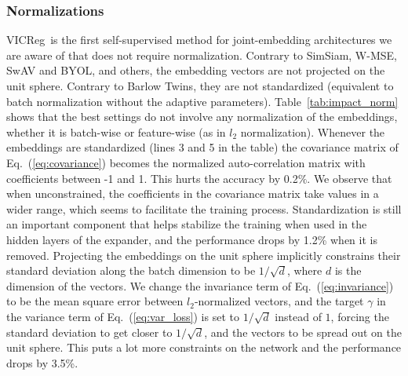 \documentclass{article}
\newcommand{\algo}{VICReg}
\newcommand{\expandernospace}{expander}
\begin{document}
\subsubsection{Normalizations} 
\algo \ is the first self-supervised method for joint-embedding architectures we are aware of that does not require normalization. Contrary to SimSiam, W-MSE, SwAV and BYOL, and others, the embedding vectors are not projected on the unit sphere. Contrary to Barlow Twins, they are not standardized (equivalent to batch normalization without the adaptive parameters). Table~\ref{tab:impact_norm} shows that the best settings do not involve any normalization of the embeddings, whether it is batch-wise or feature-wise (as in  $l_2$ normalization). Whenever the embeddings are standardized (lines 3 and 5 in the table) the covariance matrix of Eq.~(\ref{eq:covariance}) becomes the normalized auto-correlation matrix with coefficients between -1 and 1. This hurts the accuracy by 0.2$\%$. We observe that when unconstrained, the coefficients in the covariance matrix take values in a wider range, which seems to facilitate the training process. Standardization is still an important component that helps stabilize the training when used in the hidden layers of the \expandernospace, and the performance drops by 1.2\% when it is removed. Projecting the embeddings on the unit sphere implicitly constrains their standard deviation along the batch dimension to be $1/\sqrt{d}$, where $d$ is the dimension of the vectors. We change the invariance term of Eq.~(\ref{eq:invariance}) to be the mean square error between $l_2$-normalized vectors, and the target $\gamma$ in the variance term of Eq.~(\ref{eq:var_loss}) is set to $1/\sqrt{d}$ instead of $1$, forcing the standard deviation to get closer to $1/\sqrt{d}$, and the vectors to be spread out on the unit sphere. This puts a lot more constraints on the network and the performance drops by 3.5\%.

\clearpage
\end{document}
